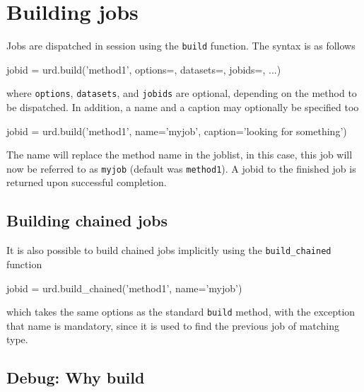 \newpage
\section{Building jobs}

Jobs are dispatched in session using the \texttt{build} function.  The
syntax is as follows\\
\begin{python}
  jobid = urd.build('method1', options={}, datasets={}, jobids={}, ...)
\end{python}
where \texttt{options}, \texttt{datasets}, and \texttt{jobids} are
optional, depending on the method to be dispatched.  In addition, a
name and a caption may optionally be specified too\\
\begin{python}
  jobid = urd.build('method1', name='myjob', caption='looking for something')
\end{python}
The name will replace the method name in the joblist, in this case,
this job will now be referred to as \texttt{myjob} (default was
\texttt{method1}).  A jobid to the finished job is returned upon
successful completion.





\subsection{Building chained jobs}
It is also possible to build chained jobs implicitly using the
\texttt{build\_chained} function\\
\begin{python}
  jobid = urd.build_chained('method1', name='myjob')
\end{python}
which takes the same options as the standard \texttt{build} method,
with the exception that name is mandatory, since it is used to find
the previous job of matching type.



\subsection{Debug:  Why build}

